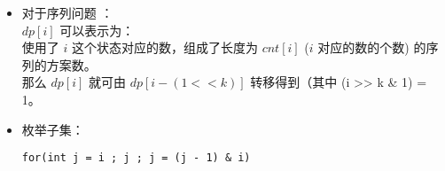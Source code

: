 \documentclass[E:/GsjzTle/main/main.tex]{subfiles}
\begin{document}
\begin{itemize}
\item
  对于序列问题 ：\\
  \(dp[i]\) 可以表示为：\\
  使用了 \(i\) 这个状态对应的数，组成了长度为 \(cnt[i]\) (\(i\)
  对应的数的个数) 的序列的方案数。\\
  那么 \(dp[i]\) 就可由 \(dp[i - (1<< k)]\) 转移得到（其中 (i
  \textgreater\textgreater{} k \& 1) = 1。
\item
  枚举子集：

  \texttt{for(int\ j\ =\ i\ ;\ j\ ;\ j\ =\ (j\ -\ 1)\ \&\ i)}
\end{itemize}
\end{document}
